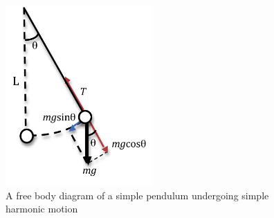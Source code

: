 \begin{figure}[h]
\centering
\includegraphics[width=0.5\textwidth]{./Exp1/pic/pendulum.png}
\caption{A free body diagram of a simple pendulum undergoing simple harmonic motion}
\label{fig:pendulum}
\end{figure}

\newpage
